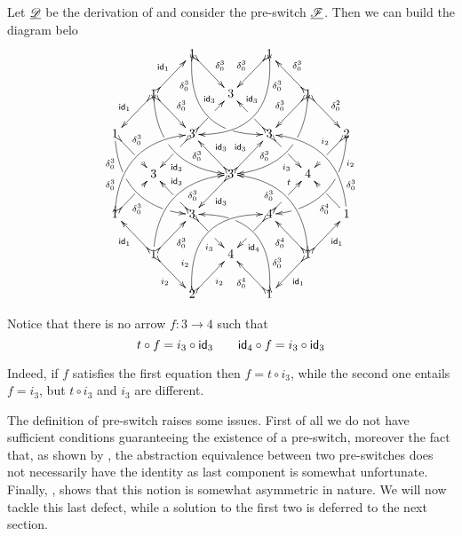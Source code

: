 \begin{example}\label{ex:abs2}
Let $\underline{\mathscr{D}}$ be the derivation of  and consider the pre-switch $\underline{\mathscr{F}}$. Then we can build the diagram belo
	\[\xymatrix@C=20pt@R=20pt{&&1 \ar@{>->}@/_.9cm/[ddrr]_(.2){\delta^3_0}|(.72)\hole
	\ar@{>->}[dr]^{\delta^3_0}&& 1\ar@{>->}@/^.9cm/[ddll]^(.2){\delta^3_0}
	\ar@{>->}[dl]_{\delta^3_0}\\
	&1\ar@{>->}[dr]^{\delta^3_0}\ar@{>->}[dl]_{\id{1}}
	\ar@{>->}@/_.7cm/[ddrr]|(.38)\hole^(.7){\delta^3_0}\ar@{>->}[ur]^{\id{1}}&& 3 &&
	1
	\ar@{>->}@/^.7cm/[ddll]|(.38)\hole_(.7){\delta^3_0}\ar@{>->}[dl]_{\delta^3_0}\ar@{>->}[lu]_{\delta^3_0}
	\ar@{>->}[dr]^{\delta^2_0}\\
	1 \ar@/_.7cm/[ddrr]_(.2){\delta^3_0}|(.325)\hole|(.81)\hole
	\ar@{>->}[dr]^(.35){\delta^3_0}|(.6)\hole && 3
	\ar@{>->}[dl]|(.4)\hole^(.65){\id{3}}\ar@{>->}[ur]|(.5)\hole^(.7){\id{3} }&&3
	\ar@{>->}[dr]|(.4)\hole_(.65){i_3}
	\ar@{>->}[ul]|(.475)\hole_(.7){\id{3}}&&2\ar@{>->}@/^.7cm/[ddll]^(.2){i_2}|(.325)\hole|(.81)\hole\ar@{>->}[dl]_(.35){i_2}|(.6)\hole\\
	&3 &&3	\ar@{>->}[dl]^{\id{3}}\ar@{>->}[ur]^{\id{3}}\ar@{>->}[ul]_{\id{3}}&&4\\
	1	\ar@{>->}@/^.7cm/[uurr]^(.2){\delta^3_0} \ar@{>->}[ur]_(.35){\delta^3_0}|(.61)\hole && 3	\ar@{>->}[ul]|(.4)\hole_(.65){\id{3}}\ar@{>->}[dr]|(.5)\hole_(.65){i_3}	&&4\ar@{>->}[ur]|(.4)\hole^(.65){t} \ar@{>->}[dl]|(.5)\hole^(.65){\id{4}}	&& 1\ar[ul]^(.35){\delta^4_0}|(.61)\hole\ar@/_.7cm/[uull]_(.2){\delta^3_0}\\ 
	&1	\ar@{>->}[ur]_{\delta^3_0} \ar@{>->}[dr]_{i_2}	\ar@{>->}[ul]^{\id{1}}\ar@/^.7cm/[uurr]_(.65){\delta^3_0}&&4&& 1\ar@{>->}[ur]_{\id{1}} \ar@{>->}[ul]^{\delta^4_0} \ar@{>->}[dl]^{\id{1}} \ar@{>->}@/_.7cm/[uull]^(.65){\delta^3_0}\\&& 2	\ar@{>->}[ur]_{i_2}\ar@{>->}@/^.9cm/[uurr]^(.2){i_2}&& 1 \ar@{>->}[ul]^{\delta^4_0} \ar@{>->}@/_.9cm/[uull]_(.2){\delta^3_0} |(.72)\hole }\] 

Notice that there is no arrow $f\colon 3\to 4$ such that 
\[t\circ f=i_3\circ \mathsf{id}_{3} \qquad \mathsf{id}_{4}\circ f=i_3\circ \mathsf{id}_{3}\]

Indeed, if $f$ satisfies the first equation then $f=t\circ i_3$, while the second one entails $f=i_3$, but $t\circ i_3$ and $i_3$ are different.
\end{example}

The definition of pre-switch raises some issues. First of all we do not have sufficient conditions guaranteeing the existence of a pre-switch, moreover the fact that, as shown by , the abstraction equivalence between two pre-switches does not necessarily have the identity as last component is somewhat unfortunate. Finally, , shows that this notion  is somewhat asymmetric in nature.  We will now tackle this last defect, while a solution to the first two is deferred to the next section.

